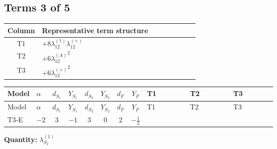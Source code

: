 \documentclass[8pt]{article}
\begin{document}
\begin{landscape}
\subsection*{Terms 3 of 5}
\begin{center}
\begin{tabular}{@{}c >{\raggedright\arraybackslash}p{0.82\linewidth}@{}}
\toprule
Column & Representative term structure \\
\midrule
T1 & \(\displaystyle +8 {\lambda_{12}^{(1)}} {\lambda_{12}^{(\times)}}\) \\
\midrule
T2 & \(\displaystyle +6 {\lambda_{12}^{(A)}}^2\) \\
\midrule
T3 & \(\displaystyle +6 {\lambda_{12}^{(\times)}}^2\) \\
\midrule
\bottomrule
\end{tabular}
\end{center}
\smallskip
\tiny
\begin{longtable}{@{}llcccccc >{\raggedright\arraybackslash}p{0.21\linewidth} >{\raggedright\arraybackslash}p{0.21\linewidth} >{\raggedright\arraybackslash}p{0.21\linewidth}@{}}
\toprule
Model & $\alpha$ & $d_{S_1}$ & $Y_{S_1}$ & $d_{S_2}$ & $Y_{S_2}$ & $d_F$ & $Y_F$ & T1 & T2 & T3 \\
\midrule
\endfirsthead
\toprule
Model & $\alpha$ & $d_{S_1}$ & $Y_{S_1}$ & $d_{S_2}$ & $Y_{S_2}$ & $d_F$ & $Y_F$ & T1 & T2 & T3 \\
\midrule
\endhead
T3-E & $-2$ & $3$ & $-1$ & $3$ & $0$ & $2$ & $-\frac{1}{2}$ & \scriptsize\adjustbox{max width=\linewidth}{$\begin{gathered} +8 {\lambda_{12}^{(1)}} {\lambda_{12}^{(\times)}}\end{gathered}$} & \scriptsize\adjustbox{max width=\linewidth}{$\begin{gathered} +6 {\lambda_{12}^{(A)}}^2\end{gathered}$} & \scriptsize\adjustbox{max width=\linewidth}{$\begin{gathered} +6 {\lambda_{12}^{(\times)}}^2\end{gathered}$} \\
\midrule
\bottomrule
\end{longtable}
\clearpage
\noindent\textbf{Quantity: }$\lambda_{S_2}^{(1)}$\par\smallskip

\end{landscape}
\end{document}
